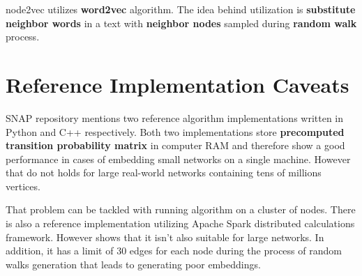 node2vec utilizes \textbf{word2vec} algorithm. The idea behind utilization is \textbf{substitute neighbor words} in a text with \textbf{neighbor nodes} sampled during \textbf{random walk} process.

\section{Reference Implementation Caveats}
SNAP repository mentions two reference algorithm implementations written in Python and C++ respectively. Both two implementations store \textbf{precomputed transition probability matrix} in computer RAM and therefore show a good performance in cases of embedding small networks on a single machine. However that do not holds for large real-world networks containing tens of millions vertices. 

That problem can be tackled with running algorithm on a cluster of nodes. There is also a reference implementation utilizing Apache Spark distributed calculations framework. However \cite{zhou2018efficient} shows that it isn't also suitable for large networks. In addition, it has a limit of 30 edges for each node during the process of random walks generation that leads to generating poor embeddings.